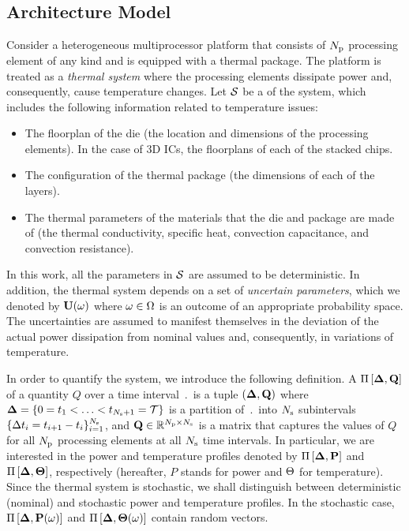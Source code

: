 \subsection{Architecture Model}  
Consider a heterogeneous multiprocessor platform that consists of ${N_\text{p}}$ processing element of any kind and is equipped with a thermal package. The platform is treated as a \emph{thermal system} where the processing elements dissipate power and, consequently, cause temperature changes. Let $\mathcal{S}$ be a  of the system, which includes the following information related to temperature issues:
\begin{itemize}
  \item The floorplan of the die (the location and dimensions of the processing elements). In the case of 3D ICs, the floorplans of each of the stacked chips.
  \item The configuration of the thermal package (the dimensions of each of the layers).
  \item The thermal parameters of the materials that the die and package are made of (the thermal conductivity, specific heat, convection capacitance, and convection resistance).
\end{itemize}
In this work, all the parameters in $\mathcal{S}$ are assumed to be deterministic. In addition, the thermal system depends on a set of \emph{uncertain parameters}, which we denoted by $\mathbf{U}(\omega)$ where $\omega \in \Omega$ is an outcome of an appropriate probability space. The uncertainties are assumed to manifest themselves in the deviation of the actual power dissipation from nominal values and, consequently, in variations of temperature.

In order to quantify the system, we introduce the following definition. A  $\prof{\m{Q}}$ of a quantity $Q$ over a time interval $\period$ is a tuple $(\part, \m{Q})$ where $\boldsymbol{\Delta} = \{ 0 = t_1 < \dotsc < t_{N_\text{s} + 1} = \mathcal{T} \}$ is a partition of $\period$ into $N_\text{s}$ subintervals $\{ \Delta t_i = t_{i+1} - t_i \}_{i = 1}^{N_\text{s}}$, and $\m{Q} \in \real^{\cores \times \steps}$ is a matrix that captures the values of $Q$ for all ${N_\text{p}}$ processing elements at all $N_\text{s}$ time intervals. In particular, we are interested in the power and temperature profiles denoted by $\prof{\mP}$ and $\Pi\left[\boldsymbol{\Delta}, {\boldsymbol\Theta}\right]$, respectively (hereafter, $P$ stands for power and $\Theta$ for temperature). Since the thermal system is stochastic, we shall distinguish between deterministic (nominal) and stochastic power and temperature profiles. In the stochastic case, $\prof{\mP(\o)}$ and $\Pi\left[\boldsymbol{\Delta}, {\boldsymbol\Theta}(\omega)\right]$ contain random vectors.
